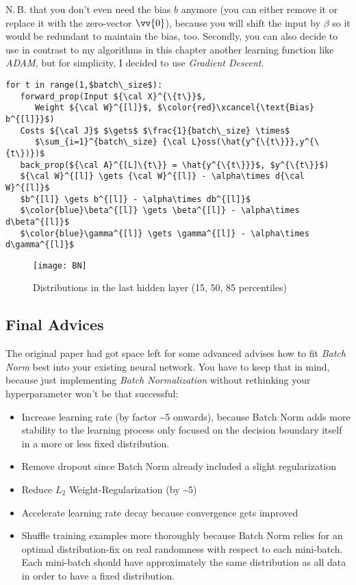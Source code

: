 \documentclass[dvipsnames,twocolumn]{scrartcl}
\begin{document}
	N.\,B. that you don't even need the bias $b$ anymore (you can either remove it or replace it with the zero-vector $\vv{0}$), because you will shift the input by $\beta$ so it would be redundant to maintain the bias, too. Secondly, you can also decide to use in contrast to my algorithms in this chapter another learning function like \emph{ADAM}, but for simplicity, I decided to use \emph{Gradient Descent}.
	
	\begin{lstlisting}[frame=single,basicstyle=\linespread{1.5}\ttfamily,caption={\texttt{Batch-Norm} Algorithm in a Deep Neural-Network}]
for t in range(1,$batch\_size$):
   forward_prop(Input ${\cal X}^{\{t\}}$,
      Weight ${\cal W}^{[l]}$, $\color{red}\xcancel{\text{Bias} b^{[l]}}$)
   Costs ${\cal J}$ $\gets$ $\frac{1}{batch\_size} \times$
      $\sum_{i=1}^{batch\_size} {\cal L}oss(\hat{y^{\{t\}}},y^{\{t\})})$
   back_prop(${\cal A}^{[L]\{t\}} = \hat{y^{\{t\}}}$, $y^{\{t\}}$)
   ${\cal W}^{[l]} \gets {\cal W}^{[l]} - \alpha\times d{\cal W}^{[l]}$
   $b^{[l]} \gets b^{[l]} - \alpha\times db^{[l]}$
   $\color{blue}\beta^{[l]} \gets \beta^{[l]} - \alpha\times d\beta^{[l]}$
   $\color{blue}\gamma^{[l]} \gets \gamma^{[l]} - \alpha\times d\gamma^{[l]}$
	\end{lstlisting}
	
	\begin{figure}
		\caption{Distributions in the last hidden layer (15, 50, 85 percentiles)~\cite{batchnorm}}
		\texttt{[image: BN]}\\
	\end{figure}
	
	\subsection{Final Advices}
	
	The original paper had got space left for some advanced advises how to fit \emph{Batch Norm} best into your existing neural network. You have to keep that in mind, because just implementing \emph{Batch Normalization} without rethinking your hyperparameter won't be that successful:
	\begin{itemize}
		\item Increase learning rate (by factor \textasciitilde{}5 onwards), because Batch Norm adds more stability to the learning process only focused on the decision boundary itself in a more or less fixed distribution.
		\item Remove dropout since Batch Norm already included a slight regularization
		\item Reduce $L_2$ Weight-Regularization (by \textasciitilde{}5)
		\item Accelerate learning rate decay because convergence gets improved
		\item Shuffle training examples more thoroughly because Batch Norm relies for an optimal distribution-fix on real randomness with respect to each mini-batch. Each mini-batch should have approximately the same distribution as all data in order to have a fixed distribution.
	\end{itemize}
	
\end{document}
